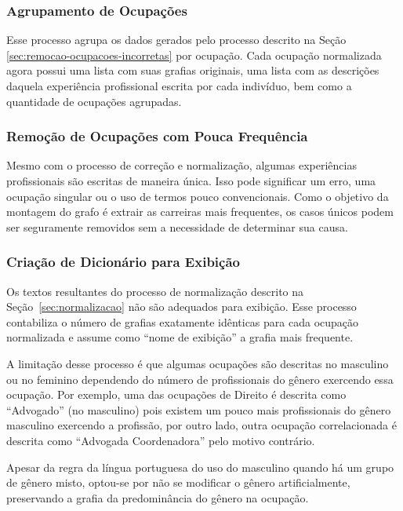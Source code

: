 \documentclass[12pt,a4paper]{article}
\begin{document}
\subsubsection{Agrupamento de Ocupações}

Esse processo agrupa os dados gerados pelo processo descrito na Seção \ref{sec:remocao-ocupacoes-incorretas} por ocupação. Cada ocupação normalizada agora possui uma lista com suas grafias originais, uma lista com as descrições daquela experiência profissional escrita por cada indivíduo, bem como a quantidade de ocupações agrupadas.

\subsubsection{Remoção de Ocupações com Pouca Frequência}

Mesmo com o processo de correção e normalização, algumas experiências profissionais são escritas de maneira única. Isso pode significar um erro, uma ocupação singular ou o uso de termos pouco convencionais. Como o objetivo da montagem do grafo é extrair as carreiras mais frequentes, os casos únicos podem ser seguramente removidos sem a necessidade de determinar sua causa.

\subsubsection{Criação de Dicionário para Exibição} \label{sec:criar-dicionario}

Os textos resultantes do processo de normalização descrito na Seção~\ref{sec:normalizacao} não são adequados para exibição. Esse processo contabiliza o número de grafias exatamente idênticas para cada ocupação normalizada e assume como \enquote{nome de exibição} a grafia mais frequente.

A limitação desse processo é que algumas ocupações são descritas no masculino ou no feminino dependendo do número de profissionais do gênero exercendo essa ocupação. Por exemplo, uma das ocupações de Direito é descrita como \enquote{Advogado} (no masculino) pois existem um pouco mais profissionais do gênero masculino exercendo a profissão, por outro lado, outra ocupação correlacionada é descrita como \enquote{Advogada Coordenadora} pelo motivo contrário.

Apesar da regra da língua portuguesa do uso do masculino quando há um grupo de gênero misto, optou-se por não se modificar o gênero artificialmente, preservando a grafia da predominância do gênero na ocupação.
\end{document}
